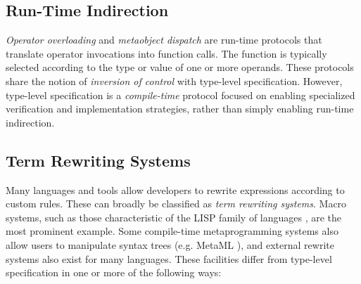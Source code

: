 \documentclass[10pt, conference, compsocconf]{IEEEtran}
\begin{document}
\subsection{Run-Time Indirection}
{\it Operator overloading} \cite{vanWijngaarden:Mailloux:Peck:Koster:Sintzoff:Lindsey:Meertens:Fisker:acta:1975} and {\it metaobject dispatch} \cite{Kiczales91} are run-time protocols that translate operator invocations into function calls. The function is typically selected according to the type or value of one or more operands. These protocols share the notion of {\it inversion of control} with type-level specification. However, type-level specification is a {\it compile-time} protocol focused on enabling specialized verification and implementation strategies, rather than simply enabling run-time indirection.

\subsection{Term Rewriting Systems}
Many languages and tools allow developers to rewrite expressions according to custom rules. These can broadly be classified as {\it term rewriting systems}. Macro systems, such as those characteristic of the LISP family of languages \cite{mccarthy1978history}, are the most prominent example. Some compile-time metaprogramming systems also allow users to manipulate syntax trees (e.g. MetaML \cite{Sheard:1999:UMS}), and external rewrite systems also exist for many languages.
These facilities differ from type-level specification in one or more of the following ways:
\end{document}
